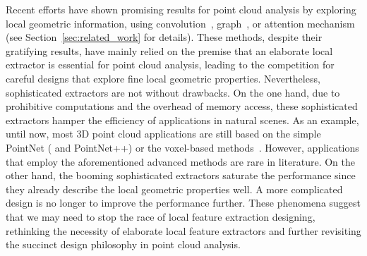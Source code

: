 Recent efforts have shown promising results for point cloud analysis by exploring local geometric information, using convolution~\citep{li2021deepgcns}, graph~\citep{li2021deepgcns}, or attention mechanism~\citep{guo2021pct} (see Section~\ref{sec:related_work} for details).
These methods, despite their gratifying results, have mainly relied on the premise that an elaborate local extractor is essential for point cloud analysis, leading to the competition for careful designs that explore fine local geometric properties. Nevertheless, sophisticated extractors are not without drawbacks.
On the one hand, due to prohibitive computations and the overhead of memory access, these sophisticated extractors hamper the efficiency of applications in natural scenes. As an example, until now, most 3D point cloud applications are still based on the simple PointNet ( and PointNet++) or the voxel-based methods~\citep{liu2021group,li2021lidar, zhang2021self}. However, applications that employ the aforementioned advanced methods are rare in literature.
On the other hand, the booming sophisticated extractors saturate the performance since they already describe the local geometric properties well. A more complicated design is no longer to improve the performance further. 
These phenomena suggest that we may need to stop the race of local feature extraction designing, rethinking the necessity of elaborate local feature extractors and further revisiting the succinct design philosophy in point cloud analysis.

